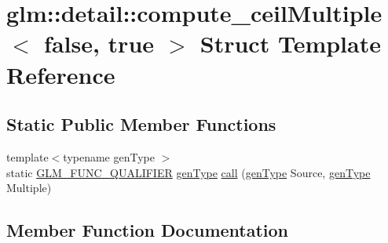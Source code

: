 \hypertarget{structglm_1_1detail_1_1compute__ceil_multiple_3_01false_00_01true_01_4}{}\section{glm\+:\+:detail\+:\+:compute\+\_\+ceil\+Multiple$<$ false, true $>$ Struct Template Reference}
\label{structglm_1_1detail_1_1compute__ceil_multiple_3_01false_00_01true_01_4}
\subsection*{Static Public Member Functions}
\begin{DoxyCompactItemize}
\item 
{\footnotesize template$<$typename gen\+Type $>$ }\\static \mbox{\hyperlink{setup_8hpp_a33fdea6f91c5f834105f7415e2a64407}{G\+L\+M\+\_\+\+F\+U\+N\+C\+\_\+\+Q\+U\+A\+L\+I\+F\+I\+ER}} \mbox{\hyperlink{structglm_1_1detail_1_1gen_type}{gen\+Type}} \mbox{\hyperlink{structglm_1_1detail_1_1compute__ceil_multiple_3_01false_00_01true_01_4_a065f8762eb2b48c4f746781fac7ab7f7}{call}} (\mbox{\hyperlink{structglm_1_1detail_1_1gen_type}{gen\+Type}} Source, \mbox{\hyperlink{structglm_1_1detail_1_1gen_type}{gen\+Type}} Multiple)
\end{DoxyCompactItemize}


\subsection{Member Function Documentation}
\mbox{\label{structglm_1_1detail_1_1compute__ceil_multiple_3_01false_00_01true_01_4_a065f8762eb2b48c4f746781fac7ab7f7}} 
